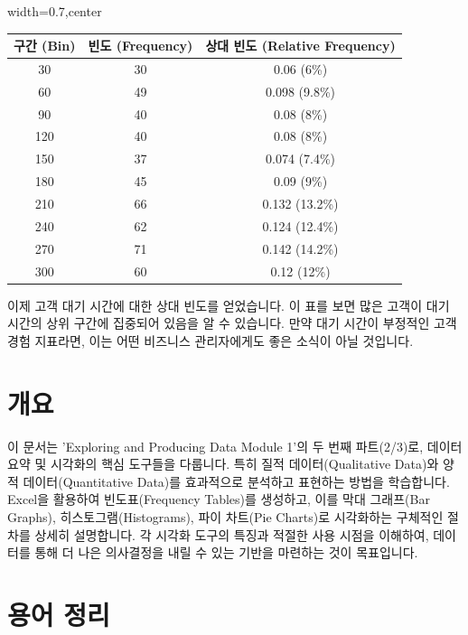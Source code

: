 \documentclass[11pt,a4paper]{article}
\begin{document}
\begin{tcolorbox}[title={상대 빈도 계산 (Calculating Relative Frequency)}]
\begin{center}
\label{tab:excel_frequency_relative_frequency_results}
\begin{adjustbox}{width=0.7\textwidth,center}
\begin{tabular}{ccc}
\toprule
\textbf{구간 (Bin)} & \textbf{빈도 (Frequency)} & \textbf{상대 빈도 (Relative Frequency)} \\
\midrule
30 & 30 & 0.06 (6\%) \\
60 & 49 & 0.098 (9.8\%) \\
90 & 40 & 0.08 (8\%) \\
120 & 40 & 0.08 (8\%) \\
150 & 37 & 0.074 (7.4\%) \\
180 & 45 & 0.09 (9\%) \\
210 & 66 & 0.132 (13.2\%) \\
240 & 62 & 0.124 (12.4\%) \\
270 & 71 & 0.142 (14.2\%) \\
300 & 60 & 0.12 (12\%) \\
\bottomrule
\end{tabular}
\end{adjustbox}
\end{center}
이제 고객 대기 시간에 대한 상대 빈도를 얻었습니다. 이 표를 보면 많은 고객이 대기 시간의 상위 구간에 집중되어 있음을 알 수 있습니다. 만약 대기 시간이 부정적인 고객 경험 지표라면, 이는 어떤 비즈니스 관리자에게도 좋은 소식이 아닐 것입니다.
\end{tcolorbox}

\newpage

\newpage
\section*{개요}
이 문서는 'Exploring and Producing Data Module 1'의 두 번째 파트(2/3)로, 데이터 요약 및 시각화의 핵심 도구들을 다룹니다.
특히 질적 데이터(Qualitative Data)와 양적 데이터(Quantitative Data)를 효과적으로 분석하고 표현하는 방법을 학습합니다.
Excel을 활용하여 빈도표(Frequency Tables)를 생성하고, 이를 막대 그래프(Bar Graphs), 히스토그램(Histograms), 파이 차트(Pie Charts)로 시각화하는 구체적인 절차를 상세히 설명합니다.
각 시각화 도구의 특징과 적절한 사용 시점을 이해하여, 데이터를 통해 더 나은 의사결정을 내릴 수 있는 기반을 마련하는 것이 목표입니다.

\newpage
\section*{용어 정리}
\end{document}
